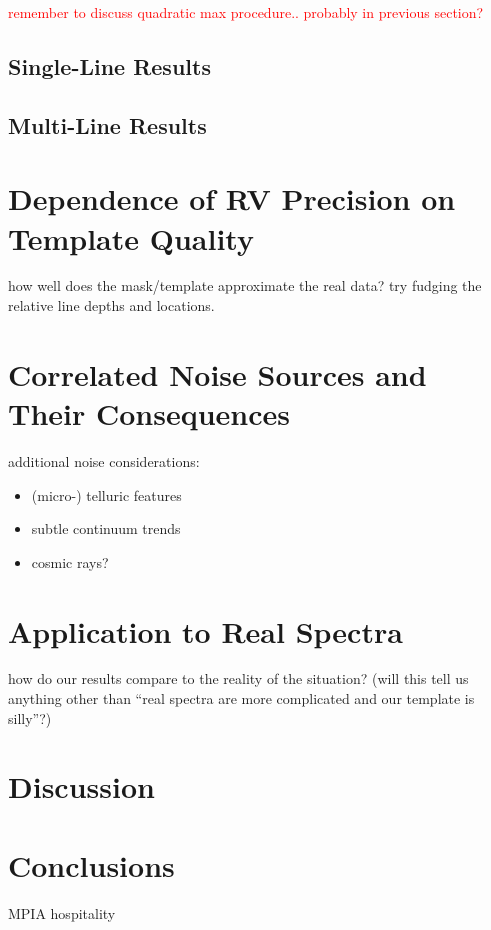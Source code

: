 \documentclass[modern]{aastex61}
\newcommand\todo[1]{\textcolor{red}{#1}}  %
\begin{document}
\todo{remember to discuss quadratic max procedure.. probably in previous section?}

\subsection{Single-Line Results}

\subsection{Multi-Line Results}

\section{Dependence of RV Precision on Template Quality}

how well does the mask/template approximate the real data? try fudging the relative line depths and locations.

\section{Correlated Noise Sources and Their Consequences}

additional noise considerations:
\begin{itemize}
\item (micro-) telluric features
\item subtle continuum trends
\item cosmic rays?
\end{itemize}

\section{Application to Real Spectra}

how do our results compare to the reality of the situation? (will this tell us anything other than ``real spectra are more complicated and our template is silly''?)

\section{Discussion}

\section{Conclusions}

\acknowledgements
MPIA hospitality


\end{document}
